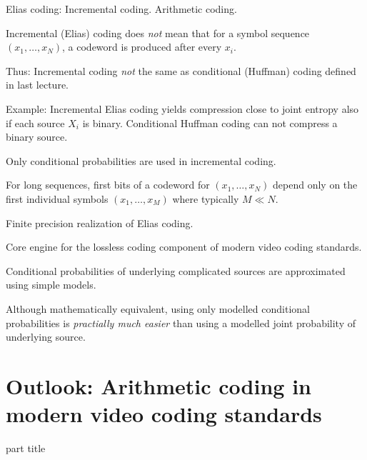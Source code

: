 \begin{frame}{Elias coding: Incremental coding. Arithmetic coding. }
\bit
\item Incremental (Elias) coding does \textit{not} mean that for a symbol sequence $(x_1,\dots,x_N)$, a codeword is 
produced after every $x_i$. 
\item Thus: Incremental coding \textit{not} the same as conditional (Huffman) coding defined in last lecture.
\item Example: Incremental Elias coding yields compression close to joint entropy also if each source $X_i$ is binary. Conditional Huffman coding can not compress a binary source. 
\item{} Only conditional probabilities are used in incremental coding.
\item{} For long sequences, first bits of a codeword for $(x_1,\dots,x_N)$ depend only on the first individual symbols $(x_1,\dots,x_M)$ where typically $M\ll N$.  
\eit
{} 
\bit
\item Finite precision realization of Elias coding. 
\item Core engine for the lossless coding component of modern video coding standards. 
\item Conditional probabilities of underlying complicated sources are approximated using simple  
models.
\item Although mathematically equivalent, using only modelled conditional probabilities is \textit{practially much easier} than using a modelled joint probability of underlying source.
\eit

\end{frame}


\section{Outlook: Arithmetic coding in modern video coding standards}


\begin{frame}
 \vspace{8.0ex}
\begin{center}
\begin{beamercolorbox}[sep=12pt,center]{part title}
\insertsection\par
\end{beamercolorbox}
\end{center}
\end{frame}


